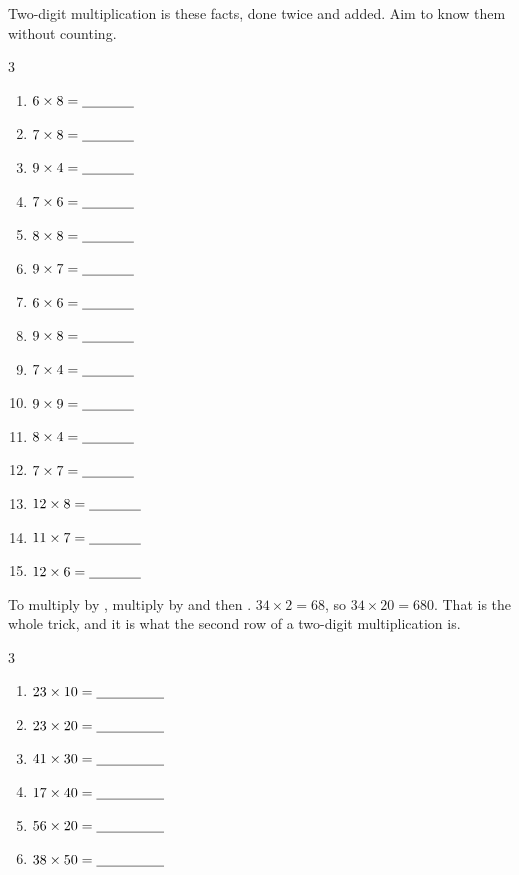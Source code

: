 \documentclass[12pt,a4paper]{article}
\begin{document}
\noindent Two-digit multiplication is these facts, done twice and added. Aim to
know them without counting.

\vspace{9pt}
\begin{multicols}{3}
\begin{enumerate}[label=(\alph*), itemsep=9pt]
  \item $6 \times 8 = \blank[1.3cm]$
  \item $7 \times 8 = \blank[1.3cm]$
  \item $9 \times 4 = \blank[1.3cm]$
  \item $7 \times 6 = \blank[1.3cm]$
  \item $8 \times 8 = \blank[1.3cm]$
  \item $9 \times 7 = \blank[1.3cm]$
  \item $6 \times 6 = \blank[1.3cm]$
  \item $9 \times 8 = \blank[1.3cm]$
  \item $7 \times 4 = \blank[1.3cm]$
  \item $9 \times 9 = \blank[1.3cm]$
  \item $8 \times 4 = \blank[1.3cm]$
  \item $7 \times 7 = \blank[1.3cm]$
  \item $12 \times 8 = \blank[1.3cm]$
  \item $11 \times 7 = \blank[1.3cm]$
  \item $12 \times 6 = \blank[1.3cm]$
\end{enumerate}
\end{multicols}


\begin{remember}
  To multiply by , multiply by  and then . $34 \times 2 = 68$, so $34 \times 20 = 680$. That is the whole trick, and
  it is what the second row of a two-digit multiplication is.
\end{remember}

\vspace{2pt}
\begin{multicols}{3}
\begin{enumerate}[label=(\alph*), itemsep=9pt]
  \item $23 \times 10 = \blank[1.7cm]$
  \item $23 \times 20 = \blank[1.7cm]$
  \item $41 \times 30 = \blank[1.7cm]$
  \item $17 \times 40 = \blank[1.7cm]$
  \item $56 \times 20 = \blank[1.7cm]$
  \item $38 \times 50 = \blank[1.7cm]$
\end{enumerate}
\end{multicols}
\end{document}
